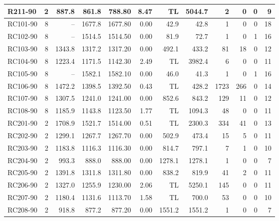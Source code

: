 \documentclass[10pt]{article}
\begin{document}
\begin{table}[p]
\begin{tabular}{lrrrrrrrrrrr}
R211-90 & 2 & 887.8 & 861.8 & 788.80 & 8.47 & TL & 5044.7 & 2 & 0 & 0 & 9 \\
\midrule
RC101-90 & 8 & -- & 1677.8 & 1677.80 & 0.00 & 42.9 & 42.8 & 1 & 0 & 0 & 18 \\
RC102-90 & 8 & -- & 1514.5 & 1514.50 & 0.00 & 81.9 & 72.7 & 1 & 0 & 1 & 16 \\
RC103-90 & 8 & 1343.8 & 1317.2 & 1317.20 & 0.00 & 492.1 & 433.2 & 81 & 18 & 0 & 12 \\
RC104-90 & 8 & 1223.4 & 1171.5 & 1142.30 & 2.49 & TL & 3982.4 & 6 & 0 & 0 & 11 \\
RC105-90 & 8 & -- & 1582.1 & 1582.10 & 0.00 & 46.0 & 41.3 & 1 & 0 & 1 & 16 \\
RC106-90 & 8 & 1472.2 & 1398.5 & 1392.50 & 0.43 & TL & 428.2 & 1723 & 266 & 0 & 14 \\
RC107-90 & 8 & 1307.5 & 1241.0 & 1241.00 & 0.00 & 852.6 & 843.2 & 129 & 11 & 0 & 12 \\
RC108-90 & 8 & 1185.9 & 1143.8 & 1123.50 & 1.77 & TL & 1094.3 & 48 & 0 & 0 & 11 \\
\midrule
RC201-90 & 2 & 1708.9 & 1521.7 & 1514.00 & 0.51 & TL & 2300.3 & 334 & 41 & 0 & 13 \\
RC202-90 & 2 & 1299.1 & 1267.7 & 1267.70 & 0.00 & 502.9 & 473.4 & 15 & 5 & 0 & 11 \\
RC203-90 & 2 & 1183.8 & 1116.3 & 1116.30 & 0.00 & 814.7 & 797.1 & 7 & 1 & 0 & 10 \\
RC204-90 & 2 & 993.3 & 888.0 & 888.00 & 0.00 & 1278.1 & 1278.1 & 1 & 0 & 0 & 7 \\
RC205-90 & 2 & 1391.8 & 1311.8 & 1311.80 & 0.00 & 838.2 & 819.9 & 41 & 2 & 0 & 11 \\
RC206-90 & 2 & 1327.0 & 1255.9 & 1230.00 & 2.06 & TL & 5250.1 & 145 & 0 & 0 & 11 \\
RC207-90 & 2 & 1180.4 & 1131.6 & 1113.70 & 1.58 & TL & 700.0 & 53 & 0 & 0 & 10 \\
RC208-90 & 2 & 918.8 & 877.2 & 877.20 & 0.00 & 1551.2 & 1551.2 & 1 & 0 & 0 & 7 \\
\bottomrule
\end{tabular}
\end{table}
\clearpage
\end{document}
